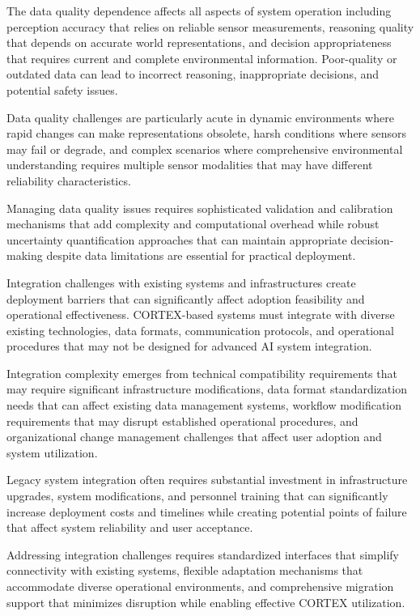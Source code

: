 The data quality dependence affects all aspects of system operation including perception accuracy that relies on reliable sensor measurements, reasoning quality that depends on accurate world representations, and decision appropriateness that requires current and complete environmental information. Poor-quality or outdated data can lead to incorrect reasoning, inappropriate decisions, and potential safety issues.

Data quality challenges are particularly acute in dynamic environments where rapid changes can make representations obsolete, harsh conditions where sensors may fail or degrade, and complex scenarios where comprehensive environmental understanding requires multiple sensor modalities that may have different reliability characteristics.

Managing data quality issues requires sophisticated validation and calibration mechanisms that add complexity and computational overhead while robust uncertainty quantification approaches that can maintain appropriate decision-making despite data limitations are essential for practical deployment.

Integration challenges with existing systems and infrastructures create deployment barriers that can significantly affect adoption feasibility and operational effectiveness. CORTEX-based systems must integrate with diverse existing technologies, data formats, communication protocols, and operational procedures that may not be designed for advanced AI system integration.

Integration complexity emerges from technical compatibility requirements that may require significant infrastructure modifications, data format standardization needs that can affect existing data management systems, workflow modification requirements that may disrupt established operational procedures, and organizational change management challenges that affect user adoption and system utilization.

Legacy system integration often requires substantial investment in infrastructure upgrades, system modifications, and personnel training that can significantly increase deployment costs and timelines while creating potential points of failure that affect system reliability and user acceptance.

Addressing integration challenges requires standardized interfaces that simplify connectivity with existing systems, flexible adaptation mechanisms that accommodate diverse operational environments, and comprehensive migration support that minimizes disruption while enabling effective CORTEX utilization.

